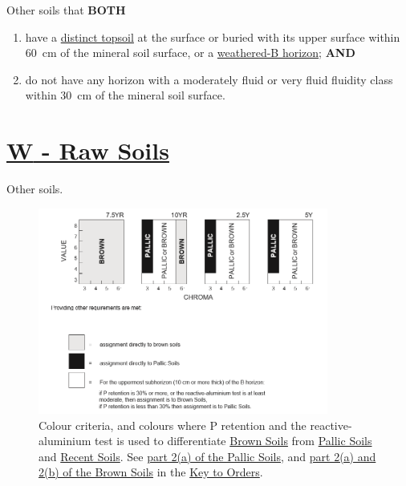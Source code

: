 \documentclass[
  letterpaper,
  DIV=11,
  numbers=noendperiod]{scrreprt}
\providecommand{\tightlist}{%
  \setlength{\itemsep}{0pt}\setlength{\parskip}{0pt}}\usepackage{longtable,booktabs,array}
\begin{document}
Other soils that \textbf{BOTH}

\begin{enumerate}
\def\labelenumi{\arabic{enumi}.}
\tightlist
\item
  have a \protect\hyperlink{sec-diag-dts}{distinct topsoil} at the
  surface or buried with its upper surface within 60~cm of the mineral
  soil surface, or a \protect\hyperlink{sec-diag-bw}{weathered-B
  horizon}; \textbf{AND}
\item
  do not have any horizon with a moderately fluid or very fluid fluidity
  class within 30~cm of the mineral soil surface.
\end{enumerate}

\hypertarget{sec-W}{%
\section{\texorpdfstring{\protect\hyperlink{sec-ord-W}{\textbf{W} - Raw
Soils}}{W - Raw Soils}}\label{sec-W}}

Other soils.

\begin{figure}

{\centering \includegraphics[width=0.85\textwidth,height=\textheight]{./images/Figure-002_pallic-vs-brown-colours_alternate-version.png}

}

\caption{\label{fig-2}Colour criteria, and colours where P retention and
the reactive-aluminium test is used to differentiate
\protect\hyperlink{sec-ord-B}{Brown Soils} from
\protect\hyperlink{sec-ord-P}{Pallic Soils} and
\protect\hyperlink{sec-ord-R}{Recent Soils}. See
\protect\hyperlink{sec-P}{part 2(a) of the Pallic Soils}, and
\protect\hyperlink{sec-B}{part 2(a) and 2(b) of the Brown Soils} in the
\protect\hyperlink{sec-key}{Key to Orders}.}

\end{figure}
\end{document}
